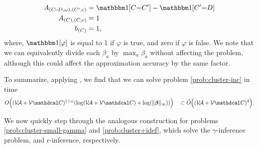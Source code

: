 \documentclass{article}
\begin{document}
\begin{lproof}
\begin{align*}
        A_{(C\!{-}\!D, \omega),(C',c)} &= \mathbbm1[C{=}C'] - \mathbbm1[C'{=}D]\\
        A_{(C),(C,c)} &= 1 \\
        b_{(C)} &= 1,
    \end{align*}
    where, $\mathbbm1[\varphi]$ is equal to 1 if $\varphi$ is true, and zero if $\varphi$ is false.
    We note that we can equivalently divide each $\beta_a$ by $\max_a \beta_a$ without affecting the problem, 
    although this could affect the approximation accuracy by the same factor. 
    
    To summarize, applying , we find that we can solve problem \eqref{prob:cluster-inc} in time
    \begin{align*}
        O\Big( (\V\!\Ar + \V\C)^{1 + \omega} ( \log (\V\!\Ar + \V\C) + \log( \Vert\bbeta\Vert_\infty)) \Big)
        \quad
        \subset \tilde O\Big( (\V\!\Ar + \V\C)^4 \Big).
    \end{align*}
\end{lproof}

We now quickly step through the analogous construction for problems \eqref{prob:cluster-small-gamma} and \eqref{prob:cluster+idef}, which
solve the $\gamma$-inference problem, and $\epsilon$-inference, respectively.
\end{document}
